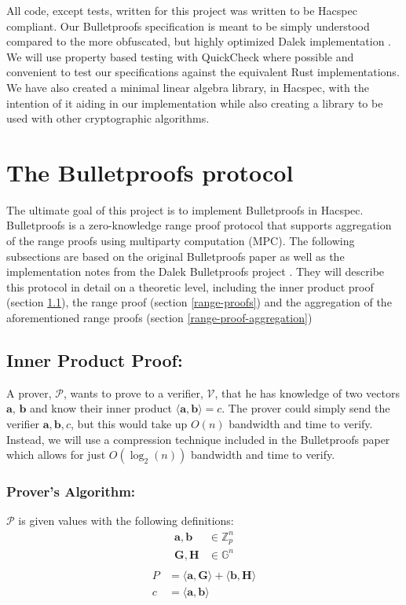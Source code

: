 \documentclass{article}
\newcommand{\eqn}[2]{\begin{equation}\label{#1}\begin{split}#2\end{split}\end{equation}}
\renewcommand{\vec}[1]{\boldsymbol{#1}}
\newcommand{\V}{\mathcal{V}}
\renewcommand{\P}{\mathcal{P}}
\newcommand{\G}{\mathbb{G}}
\newcommand{\Z}{\mathbb{Z}}
\newcommand{\dotp}[2]{\langle #1, #2 \rangle}
\begin{document}
All code, except tests, written for this project was written to be
Hacspec compliant. Our Bulletproofs specification is meant to be simply
understood compared to the more obfuscated, but highly optimized Dalek
implementation \cite{dalek}. We will use property based testing with
QuickCheck \cite{quickcheck} where possible and convenient to test
our specifications against the equivalent Rust implementations. We
have also created a minimal linear algebra library, in Hacspec, with
the intention of it aiding in our implementation while also creating
a library to be used with other cryptographic algorithms.

\section{The Bulletproofs protocol} \label{bulletproofs}

The ultimate goal of this project is to implement Bulletproofs in
Hacspec. Bulletproofs is a zero-knowledge range proof protocol that
supports aggregation of the range proofs using multiparty computation
(MPC). The following subsections are based on the original Bulletproofs
paper \cite{bulletproofs} as well as the implementation notes from the
Dalek Bulletproofs project \cite{dalek-notes}. They will describe this
protocol in detail on a theoretic level, including the inner product
proof (section \ref{inner-product-proof}), the range proof (section
\ref{range-proofs}) and the aggregation of the aforementioned range
proofs (section \ref{range-proof-aggregation})

\subsection{Inner Product Proof:} \label{inner-product-proof}
A prover, $\P$, wants to prove to a verifier, $\V$, that he has
knowledge of two vectors $\vec{a}$, $\vec{b}$ and know their inner
product $\dotp{\vec{a}}{\vec{b}} = c$. The prover could simply send
the verifier $\vec{a}, \vec{b}, c$, but this would take up $O(n)$
bandwidth and time to verify. Instead, we will use a compression
technique included in the Bulletproofs paper which allows for just
$O(\log_2(n))$ bandwidth and time to verify.

\subsubsection{Prover's Algorithm:}
$\P$ is given values with the following definitions:
\eqn{ipp-def1}{
	\vec{a}, \vec{b} &\in \Z^n_p \\
	\vec{G}, \vec{H} &\in \G^n \\
}
\eqn{ipp-def2}{
	P &= \dotp{\vec{a}}{\vec{G}} + \dotp{\vec{b}}{\vec{H}} \\
	c &= \dotp{\vec{a}}{\vec{b}} \\
}
\end{document}
